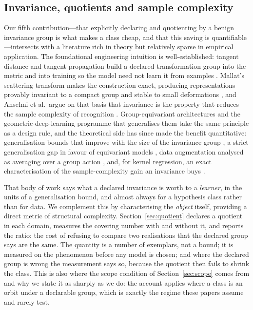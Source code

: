 \documentclass[10pt]{article}
\theoremstyle{plain}
\theoremstyle{definition}
\theoremstyle{remark}
\begin{document}
\subsection{Invariance, quotients and sample complexity}
\label{sec:rw-invariance}

Our fifth contribution---that explicitly declaring and quotienting by a benign
invariance group is what makes a class cheap, and that this saving is
quantifiable---intersects with a literature rich in theory but relatively sparse
in empirical application. The foundational engineering intuition is well-established: tangent distance and tangent propagation
build a declared transformation group into the metric and into training so the
model need not learn it from examples \citep{simard1998transformation}. Mallat's
scattering transform makes the construction exact, producing representations
provably invariant to a compact group and stable to small deformations
\citep{mallat2012group, bruna2013invariant}, and Anselmi et al.\ argue on that
basis that invariance is the property that reduces the sample complexity of
recognition \citep{anselmi2016unsupervised}. Group-equivariant architectures
\citep{cohen2016group} and the geometric-deep-learning programme that
generalises them \citep{bronstein2021geometric} take the same principle as a
design rule, and the theoretical side has since made the benefit quantitative:
generalisation bounds that improve with the size of the invariance group
\citep{sokolic2017generalization, bietti2019group}, a strict generalisation gap
in favour of equivariant models \citep{elesedy2021provably}, data augmentation
analysed as averaging over a group action
\citep{chen2019grouptheoretic}, and, for kernel regression, an exact
characterisation of the sample-complexity gain an invariance buys
\citep{tahmasebi2023exact}.

That body of work says what a declared invariance is worth to a \emph{learner},
in the units of a generalisation bound, and almost always for a hypothesis
class rather than for data. We complement this by characterising the
\emph{object} itself, providing a direct metric of structural complexity. Section~\ref{sec:quotient}
declares a quotient in each domain, measures the covering number with and
without it, and reports the ratio: the cost of refusing to compare two
realisations that the declared group says are the same. The quantity is a
number of exemplars, not a bound; it is measured on the phenomenon before any
model is chosen; and where the declared group is wrong the measurement says so,
because the quotient then fails to shrink the class. This is also where the
scope condition of Section~\ref{sec:scope} comes from and why we state it as
sharply as we do: the account applies where a class is an orbit under a
declarable group, which is exactly the regime these papers assume and rarely
test.
\end{document}
